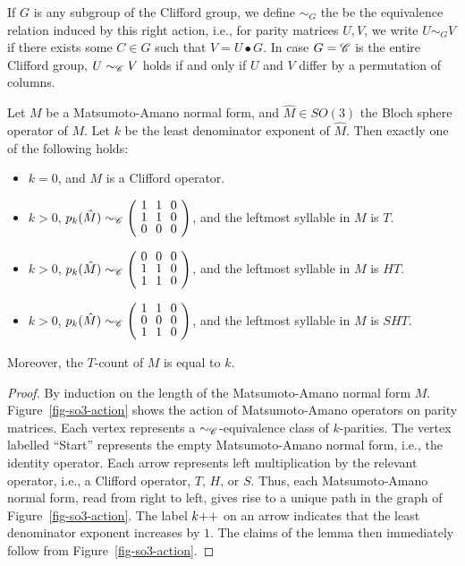 \begin{definition}\label{def-simg}
  If $G$ is any subgroup of the Clifford group, we define $\sim_G$ the be the equivalence relation
  induced by this right action, i.e., for parity matrices $U,V$, we write $U\sim_G V$ if there
  exists some $C\in G$ such that $V=U\bullet G$. In case $G=\mathscr{C}$ is the entire Clifford group,
  $U\sim_{\mathscr{C}} V$ holds if and only if $U$ and $V$ differ by a permutation of columns.
\end{definition}

\begin{lemma}\label{lem-ma}
  Let $M$ be a Matsumoto-Amano normal form, and $\hat M\in SO(3)$ the Bloch sphere operator of $M$.
  Let $k$ be the least denominator exponent of $\hat M$. Then exactly one of the following holds:\rm
  \begin{itemize}
    \item $k=0$, and $M$ is a Clifford operator.
    \item $k>0$, $p_k(\hat M)\sim_{\sC} \zmatrix{ccc}{1&1&0 \\ 1&1&0 \\
        0&0&0}$, and the leftmost syllable in $M$ is $T$.
    \item $k>0$, $p_k(\hat M)\sim_{\sC} \zmatrix{ccc}{0&0&0 \\ 1&1&0 \\ 1&1&0}$, and the
      leftmost syllable in $M$ is $HT$.
    \item $k>0$, $p_k(\hat M)\sim_{\sC} \zmatrix{ccc}{1&1&0 \\ 0&0&0 \\
        1&1&0}$, and the leftmost syllable in $M$ is $SHT$.
  \end{itemize}
  Moreover, the $T$-count of $M$ is equal to $k$.
\end{lemma}

\begin{proof}
  By induction on the length of the Matsumoto-Amano normal form $M$. Figure~\ref{fig-so3-action}
  shows the action of Matsumoto-Amano operators on parity matrices. Each vertex represents a
  $\sim_{\mathscr{C}}$-equivalence class of $k$-parities. The vertex labelled ``Start'' represents the
  empty Matsumoto-Amano normal form, i.e., the identity operator. Each arrow represents left
  multiplication by the relevant operator, i.e., a Clifford operator, $T$, $H$, or $S$. Thus, each
  Matsumoto-Amano normal form, read from right to left, gives rise to a unique path in the graph of
  Figure~\ref{fig-so3-action}. The label $k{++}$ on an arrow indicates that the least denominator
  exponent increases by $1$. The claims of the lemma then immediately follow from
  Figure~\ref{fig-so3-action}.
\end{proof}

